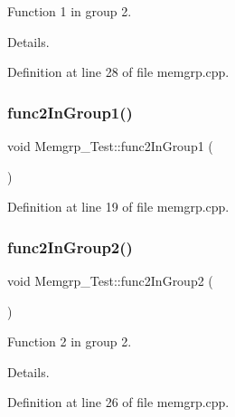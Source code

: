 Function 1 in group 2. 

Details. 

Definition at line 28 of file memgrp.\+cpp.


\begin{DoxyCode}{0}

\end{DoxyCode}
\mbox{\label{class_memgrp___test_a8296fa2c355e84ecf25522d54807548c}} 
\subsubsection{\texorpdfstring{func2InGroup1()}{func2InGroup1()}}
{\footnotesize\ttfamily void Memgrp\+\_\+\+Test\+::func2\+In\+Group1 (\begin{DoxyParamCaption}{ }\end{DoxyParamCaption})}



Definition at line 19 of file memgrp.\+cpp.


\begin{DoxyCode}{0}

\end{DoxyCode}
\mbox{\label{class_memgrp___test_a9ce862049bb543596343e81ad3ddddff}} 
\subsubsection{\texorpdfstring{func2InGroup2()}{func2InGroup2()}}
{\footnotesize\ttfamily void Memgrp\+\_\+\+Test\+::func2\+In\+Group2 (\begin{DoxyParamCaption}{ }\end{DoxyParamCaption})\hspace{0.3cm}{\ttfamily [protected]}}



Function 2 in group 2. 

Details. 

Definition at line 26 of file memgrp.\+cpp.


\begin{DoxyCode}{0}

\end{DoxyCode}
\mbox{\label{class_memgrp___test_a8a3a4ac34b2e25696159ac420bd4bdc6}} 
